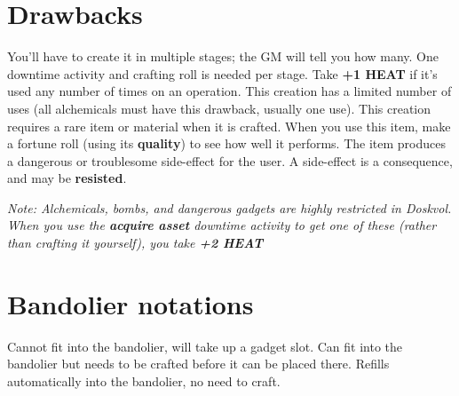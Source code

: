 \documentclass{article}
\begin{document}
\begin{multicols*}{3}
\section*{Drawbacks}
\begin{itemize}
    You'll have to create it in multiple stages; the GM will tell you how many.
    One downtime activity and crafting roll is needed per stage.
    Take \textbf{+1 \uppercase{heat}} if it's used any number of times on an operation.
    This creation has a limited number of uses (all alchemicals must have this drawback, usually one use).
    This creation requires a rare item or material when it is crafted.
    When you use this item, make a fortune roll (using its \textbf{quality}) to see how well it performs.
    The item produces a dangerous or troublesome side-effect for the user.
    A side-effect is a consequence, and may be \textbf{resisted}.
\end{itemize}

\textit{
    Note: Alchemicals, bombs, and dangerous gadgets are highly restricted in Doskvol.
    When you use the \textbf{acquire asset} downtime activity to get one of these (rather than crafting it yourself), you take \textbf{+2 \uppercase{heat}}
}


\section*{Bandolier notations}
\begin{itemize}
    Cannot fit into the bandolier, will take up a gadget slot.
    Can fit into the bandolier but needs to be crafted before it can be placed there.
    Refills automatically into the bandolier, no need to craft.
\end{itemize}

\end{multicols*}
\end{document}
